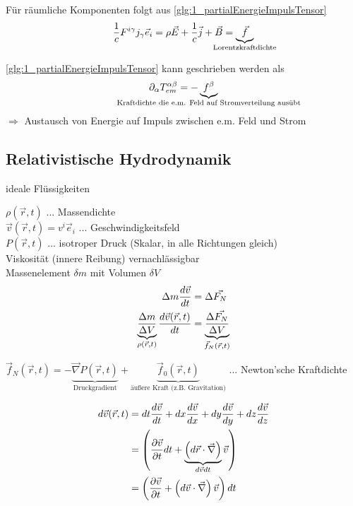\documentclass[a4paper, 11pt]{article}
\numberwithin{equation}{section}
\newcommand{\ubtext}[2]{\underbrace{#1}_{\mathclap{\text{#2}}}}
\begin{document}
Für räumliche Komponenten folgt aus \ref{glg:1_partialEnergieImpulsTensor}
\begin{equation}
\dfrac{1}{c}F^{i \gamma} j_\gamma \vec{e}_i = \rho \vec{E} + \dfrac{1}{c} \vec{j} + \vec{B} = \underbrace{\vec{f}}_{\mathclap{\text{Lorentzkraftdichte}}}
\end{equation}

\ref{glg:1_partialEnergieImpulsTensor} kann geschrieben werden als
\begin{equation}
\partial_\alpha T^{\alpha \beta}_{em} = - \underbrace{f^\beta}_{\mathclap{\text{Kraftdichte die e.m. Feld auf Stromverteilung ausübt}}}
\end{equation}
$\Rightarrow$ Austausch von Energie auf Impuls zwischen e.m. Feld und Strom



\subsection*{Relativistische Hydrodynamik}
ideale Flüssigkeiten

$\rho(\vec{r}, t)$ $...$ Massendichte\\
$\vec{v}(\vec{r}, t) = v^i \vec{e}_i$ $...$ Geschwindigkeitsfeld\\
$P(\vec{r}, t)$ $...$ isotroper Druck (Skalar, in alle Richtungen gleich) \\
Viskosität (innere Reibung) vernachlässigbar \\
Massenelement $\delta m$ mit Volumen $\delta V$
\begin{align}
\Delta m \dfrac{d\vec{v}}{dt} &= \Delta \vec{F_N} \nonumber \\ 
\underbrace{\dfrac{\Delta m}{\Delta V}}_{\mathclap{\rho(\vec{r}, t)}} \dfrac{d\vec{v}(\vec{r}, t)}{dt} &= \underbrace{\dfrac{\Delta \vec{F_N}}{\Delta V}}_{\mathclap{\vec{f}_N(\vec{r}, t)}}
\end{align}

$\vec{f}_N(\vec{r}, t) = - \underbrace{ \vec{\nabla}  P (\vec{r}, t)}_{\text{Druckgradient}} + \underbrace{\vec{f}_0 (\vec{r}, t)}_{\text{äußere Kraft (z.B. Gravitation)}}$ $...$ Newton'sche Kraftdichte

\begin{equation}
\begin{aligned}
d \vec{v}(\vec{r}, t) &= dt \dfrac{d\vec{v}}{dt} +dx \dfrac{d\vec{v}}{dx} +dy \dfrac{d\vec{v}}{dy} + dz \dfrac{d\vec{v}}{dz}\\
&= \left(\dfrac{\partial \vec{v}}{\partial t} dt + \ubtext{ \left( d\vec{r} \cdot \vec{\nabla} \right)}{$d\vec{v} dt$}  \vec{v} \right) \\
&= \left(\dfrac{\partial \vec{v}}{\partial t} + \left( d\vec{v} \cdot \vec{\nabla} \right)  \vec{v} \right) dt \\
\end{aligned}
\end{equation}
\end{document}
